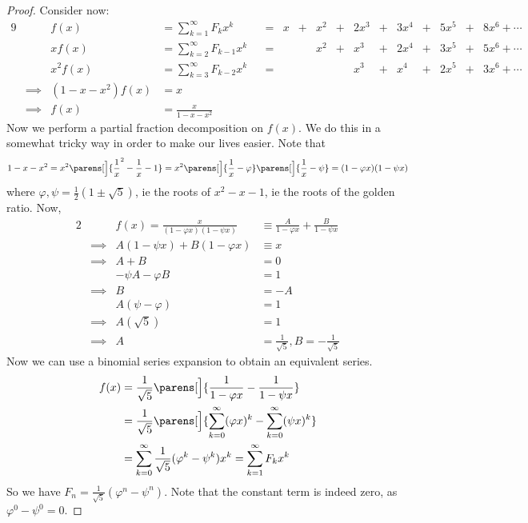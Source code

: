 \begin{proof}
Consider now:
\begin{alignat*}9
    && f(x) &= \sum_{k = 1}^\infty F_k x^k
        &&={}& x &+{}& x^2 &+{}& 2x^3 &+{}&
            3x^4 &+{}& 5x^5 &+{}& 8x^6 + \dotsb \\
    && x f(x) &= \sum_{k = 2}^\infty F_{k - 1} x^k
        &&={}& &&x^2 &+{}& x^3 &+{}& 2x^4 &+{}&
            3x^5 &+{}& 5x^6 + \dotsb \\
    && x^2 f(x) &= \sum_{k = 3}^\infty F_{k - 2}x^k
        &&={}& &&&& x^3 &+{}& x^4 &+{}& 2x^5 &+{}& 3x^6 + \dotsb \\
    &\implies{}& (1 - x - x^2) f(x) &= x \\
    &\implies{}& f(x) &= \frac x{1 - x - x^2}
\end{alignat*}
Now we perform a partial fraction decomposition on \(f(x)\). We do this in a
somewhat tricky way in order to make our lives easier. Note that
\begin{equation*}
1 - x - x^2 = x^2 \parens[\Big]{\frac 1x^2 - \frac 1x - 1}
    = x^2\parens[\Big]{\frac 1x - \varphi}\parens[\Big]{\frac 1x - \psi}
    = (1 - \varphi x)(1 - \psi x)
\end{equation*}
where \(\varphi, \psi = \frac 12(1 \pm \sqrt 5)\), ie the roots of
\(x^2 - x - 1\), ie the roots of the golden ratio. Now,
\begin{alignat*}2
    && f(x) = \frac x{(1 - \varphi x)(1 - \psi x)}
        &\equiv \frac A{1 - \varphi x} + \frac B{1 - \psi x} \\
    &\implies{}& A(1 - \psi x) + B(1 - \varphi x) &\equiv x \\
    &\implies{}& A + B &= 0 \\
    && -\psi A - \varphi B &= 1 \\
    &\implies{}& B &= -A  \\
    && A(\psi - \varphi) &= 1 \\
    &\implies{}& A(\sqrt 5) &= 1 \\
    &\implies{}& A &= \frac 1{\sqrt 5}, B = -\frac 1{\sqrt 5}
\end{alignat*}
Now we can use a binomial series expansion to obtain an equivalent series.
\begin{align*}
f(x) &= \frac 1{\sqrt 5}\parens[\Big]{\frac 1{1 - \varphi x}
                            - \frac 1{1 - \psi x}} \\
&= \frac 1{\sqrt 5}\parens[\Big]{\sum_{k = 0}^\infty (\varphi x)^k
                       - \sum_{k = 0}^\infty (\psi x)^k} \\
&= \sum_{k = 0}^\infty \frac 1{\sqrt 5}(\varphi^k - \psi^k)x^k
= \sum_{k = 1}^\infty F_k x^k
\end{align*}
So we have \(F_n = \frac 1{\sqrt 5}(\varphi^n - \psi^n)\). Note that the
constant term is indeed zero, as \(\varphi^0 - \psi^0 = 0\).
\end{proof}
